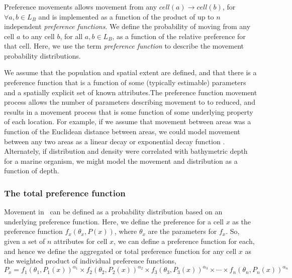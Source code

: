\subsubsection{}

Preference movements allows movement from any $cell(a) \rightarrow cell(b)$, for $\forall a,b \in L_B$ and is implemented as a function of the product of up to $n$ independent \emph{preference functions}. We define the probability of moving from any cell $a$ to any cell $b$, for all $a,b \in L_B$, as a function of the relative preference for that cell. Here, we use the term \emph{preference function} \citep{1366,1367} to describe the movement probability distributions. 

We assume that the population and spatial extent are defined, and that there is a preference function that is a function of some (typically estimable) parameters and a spatially explicit set of known attributes.The preference function movement process allows the number of parameters describing movement to to reduced, and results in a movement process that is some function of some underlying property of each location. For example, if we assume that movement between areas was a function of the Euclidean distance between areas, we could model movement between any two areas as a linear decay or exponential decay function \citep{1366}. Alternately, if distribution and density were correlated with bathymetric depth for a marine organism, we might model the movement and distribution as a function of depth. 

\subsubsection*{The total preference function}

Movement in \SPM\ can be defined as a probability distribution based on an underlying preference function. Here, we define the preference for a cell $x$ as the preference function $f_x(\theta_x,P(x))$, where $\theta_x$ are the parameters for $f_x$. So, given a set of $n$ attributes for cell $x$, we can define a preference function for each, and hence we define the aggregated or total preference function for any cell $x$ as the weighted product of individual preference functions,
\begin{equation}
  P_x=f_1(\theta_1,P_1(x))^{\alpha_1} \times f_2(\theta_2,P_2(x))^{\alpha_2} \times f_3(\theta_3,P_3(x))^{\alpha_3} \times \cdots \times f_n(\theta_n,P_n(x))^{\alpha_n}
\end{equation}

